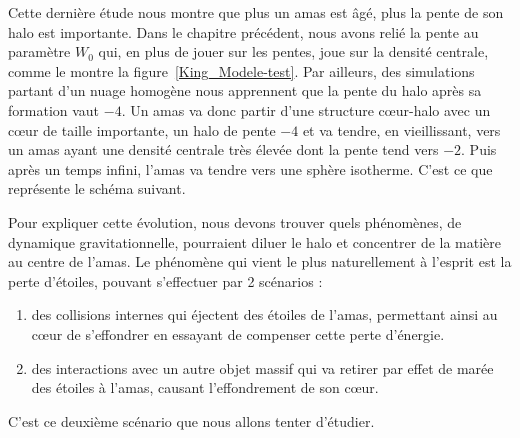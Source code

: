 Cette dernière étude nous montre que plus un amas est âgé, plus la pente de son halo est importante.
Dans le chapitre précédent, nous avons relié la pente au paramètre $W_0$ qui, en plus de jouer sur les pentes, joue sur la densité centrale, comme le montre la figure~\ref{King_Modele-test}.
Par ailleurs, des simulations partant d'un nuage homogène nous apprennent que la pente du halo après sa formation vaut $-4$.
Un amas va donc partir d'une structure cœur-halo avec un cœur de taille importante, un halo de pente $-4$ et va tendre, en vieillissant, vers un amas ayant une densité centrale très élevée dont la pente tend vers $-2$.
Puis après un temps infini, l'amas va tendre vers une sphère isotherme.
C'est ce que représente le schéma suivant.



Pour expliquer cette évolution, nous devons trouver quels phénomènes, de dynamique gravitationnelle, pourraient diluer le halo et concentrer de la matière au centre de l'amas. Le phénomène qui vient le plus naturellement à l'esprit est la perte d'étoiles, pouvant s'effectuer par 2 scénarios :
\begin{enumerate}
	\item des collisions internes qui éjectent des étoiles de l'amas, permettant ainsi au cœur de s'effondrer en essayant de compenser cette perte d'énergie.
	\item des interactions avec un autre objet massif qui va retirer par effet de marée des étoiles à l'amas, causant l'effondrement de son cœur.
\end{enumerate}
C'est ce deuxième scénario que nous allons tenter d'étudier.

















